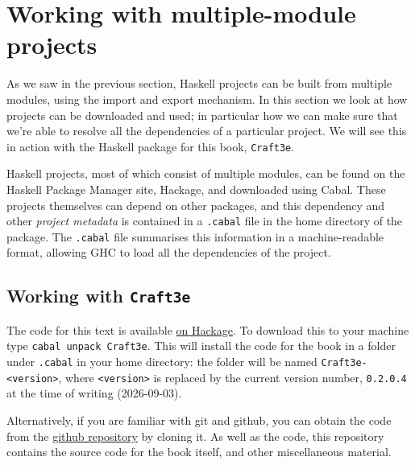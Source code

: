 \section{Working with multiple-module projects}
\label{multipleModuleProgs}

As we saw in the previous section, Haskell projects can be built from multiple modules, using the import and export mechanism. In this section we look at how projects can be downloaded and used; in particular how we can make sure that we're able to resolve all the dependencies of a particular project. We will see this in action with the Haskell package for this book, \texttt{Craft3e}.

Haskell projects, most of which consist of multiple modules, can be found on the Haskell Package Manager site, Hackage, and downloaded using Cabal. These projects themselves can depend on other packages, and this dependency and other \emph{project metadata} is contained in a \texttt{.cabal} file in the home directory of the package. The \texttt{.cabal} file summarises this information in a machine-readable format, allowing GHC to load all the dependencies of the project.

\subsection*{Working with \texttt{Craft3e}}

The code for this text is available \href{https://hackage.haskell.org/package/Craft3e}{on Hackage}.
To download this to your machine type \texttt{cabal unpack Craft3e}. This will install the code for the book in a folder under \texttt{.cabal} in your home directory: the folder will be named \texttt{Craft3e-<version>}, where \texttt{<version>} is replaced by the current version number, \texttt{0.2.0.4} at the time of writing (2026-09-03).

Alternatively, if you are familiar with git and github, you can obtain the code from the \href{https://github.com/simonjohnthompson/haskellcraft}{github repository} by cloning it. As well as the code, this repository contains the source code for the book itself, and other miscellaneous material.

